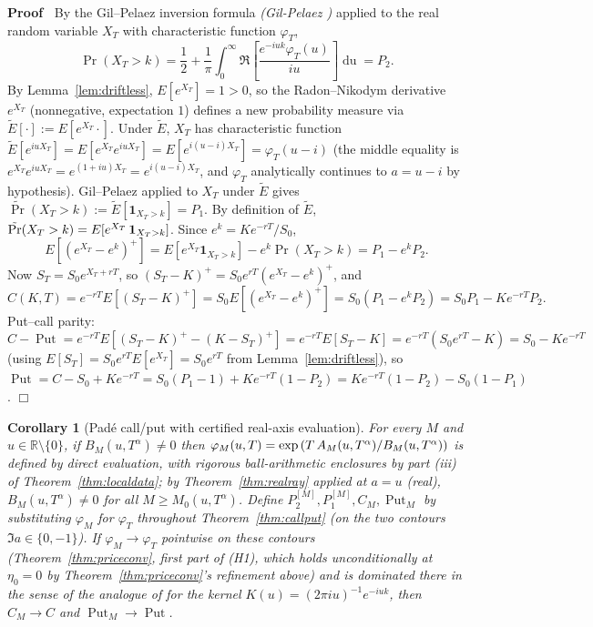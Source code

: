 \documentclass{article}
\newcommand{\assign}{:=}
\newcommand{\tmem}[1]{{\em #1\/}}
\newcommand{\tmop}[1]{\ensuremath{\operatorname{#1}}}
\newcommand{\tmtextup}[1]{\text{{\upshape{#1}}}}
\newenvironment{proof}{\noindent\textbf{Proof\ }}{\hspace*{\fill}$\Box$\medskip}
\newtheorem{corollary}{Corollary}
\newcommand{\R}{\mathbb{R}}
\begin{document}
\begin{proof}
  By the Gil--Pelaez inversion formula {\tmem{(Gil-Pelaez
  {\cite{GilPelaez}})}} applied to the real random variable $X_T$ with
  characteristic function $\varphi_T$,
  \[ \Pr (X_T > k) = \frac{1}{2} + \frac{1}{\pi} \int_0^{\infty} \Re \left[
     \frac{e^{- iuk} \varphi_T (u)}{iu} \right] \tmop{du} = P_2 . \]
  By Lemma~\ref{lem:driftless}, $E [e^{X_T}] = 1 > 0$, so the Radon--Nikodym
  derivative $e^{X_T}$ (nonnegative, expectation $1$) defines a new
  probability measure via $\tilde{E} [\cdot] \assign E [e^{X_T}  \cdot]$.
  Under $\tilde{E}$, $X_T$ has characteristic function $\tilde{E} [e^{iuX_T}]
  = E [e^{X_T} e^{iuX_T}] = E [e^{i (u - i) X_T}] = \varphi_T (u - i)$ (the
  middle equality is $e^{X_T} e^{iuX_T} = e^{(1 + iu) X_T} = e^{i (u - i)
  X_T}$, and $\varphi_T$ analytically continues to $a = u - i$ by
  hypothesis). Gil--Pelaez applied to $X_T$ under $\tilde{E}$ gives
  $\tilde{\Pr} (X_T > k) \assign \tilde{E} [\mathbf{1}_{X_T > k}] = P_1$. By
  definition of $\tilde{E}$, $\tilde{\Pr} (X_T > k) = E [e^{X_T}
  \hspace{0.17em} \mathbf{1}_{X_T > k}]$.
  Since $e^k = K e^{- rT} / S_0$,
  \[ E [(e^{X_T} - e^k)^+] = E [e^{X_T}  \mathbf{1}_{X_T > k}] - e^k \Pr (X_T
     > k) = P_1 - e^k P_2 . \]
  Now $S_T = S_0 e^{X_T + rT}$, so $(S_T - K)^+ = S_0 e^{rT} (e^{X_T} -
  e^k)^+$, and
  \[ C (K, T) = e^{- rT} E [(S_T - K)^+] = S_0  E [(e^{X_T} - e^k)^+] = S_0
     (P_1 - e^k P_2) = S_0 P_1 - K e^{- rT} P_2 . \]
  Put--call parity: $C - \tmop{Put} = e^{- rT} E [(S_T - K)^+ - (K - S_T)^+]
  = e^{- rT} E [S_T - K] = e^{- rT} (S_0 e^{rT} - K) = S_0 - K e^{- rT}$
  (using $E [S_T] = S_0 e^{rT} E [e^{X_T}] = S_0 e^{rT}$ from
  Lemma~\ref{lem:driftless}), so $\tmop{Put} = C - S_0 + K e^{- rT} = S_0
  (P_1 - 1) + K e^{- rT} (1 - P_2) = K e^{- rT} (1 - P_2) - S_0 (1 - P_1)$.
\end{proof}

\begin{corollary}
  [Pad{\'e} call/put with certified real-axis evaluation]\label{cor:callputM}
  For every $M$ and $u \in \R \setminus \{ 0 \}$, if $B_M (u, T^{\alpha}) \ne
  0$ then $\varphi_M (u, T) = \exp \left( T \hspace{0.17em} A_M (u,
  T^{\alpha}) / B_M (u, T^{\alpha}) \right)$ is defined by direct evaluation,
  with rigorous ball-arithmetic enclosures by part (iii) of
  Theorem~\ref{thm:localdata}; by Theorem~\ref{thm:realray} applied at $a =
  u$ (real), $B_M (u, T^{\alpha}) \ne 0$ for all $M \ge M_0 (u,
  T^{\alpha})$. Define $P_2^{[M]}, P_1^{[M]}, C_M, \tmop{Put}_M$ by
  substituting $\varphi_M$ for $\varphi_T$ throughout
  Theorem~\ref{thm:callput} (on the two contours $\Im  a \in \{ 0, - 1 \}$).
  If $\varphi_M \to \varphi_T$ pointwise on these contours
  (Theorem~\ref{thm:priceconv}, first part of (H1), which holds
  unconditionally at $\eta_0 = 0$ by Theorem~\ref{thm:priceconv}'s
  refinement above) and is dominated there in the sense of the analogue of
  \tmtextup{(H2)} for the kernel $K (u) = \left( 2 \pi iu \right)^{- 1} e^{-
  iuk}$, then $C_M \to C$ and $\tmop{Put}_M \to \tmop{Put}$.
\end{corollary}
\end{document}
